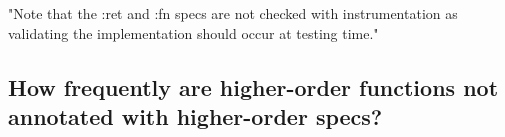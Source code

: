 "Note that the :ret and :fn specs are not checked with instrumentation as validating the implementation should occur at testing time."


\subsection{How frequently are higher-order functions not annotated with higher-order specs?}









